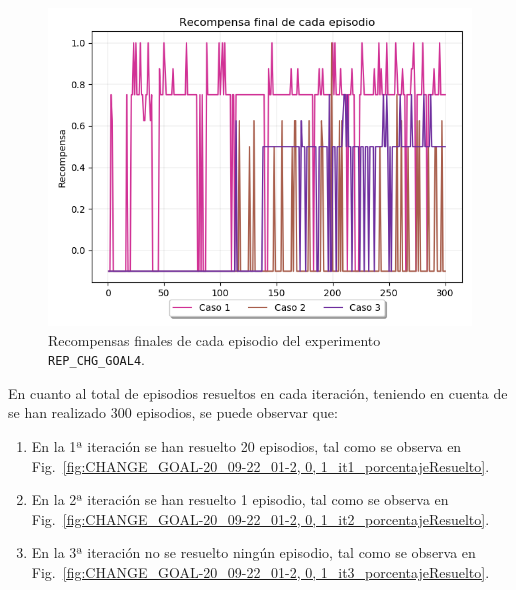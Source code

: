 \begin{figure}
    \centering
    \includegraphics[scale=0.4]{cap5_experimentacion/images/CHANGE_GOAL-20_09-22_01-2, 0, 1_recompensa.png}
    \caption{Recompensas finales de cada episodio del experimento \texttt{REP\_CHG\_GOAL4}.}
    \label{fig:CHANGE_GOAL-20_09-22_01-2, 0, 1_recompensa}
\end{figure}

En cuanto al total de episodios resueltos en cada iteración, teniendo en cuenta de se han realizado 300 episodios, se puede observar que: 
\begin{enumerate}
    \item En la 1ª iteración se han resuelto 20 episodios, tal como se observa en Fig.~\ref{fig:CHANGE_GOAL-20_09-22_01-2, 0, 1_it1_porcentajeResuelto}.
    \item En la 2ª iteración se han resuelto 1 episodio, tal como se observa en Fig.~\ref{fig:CHANGE_GOAL-20_09-22_01-2, 0, 1_it2_porcentajeResuelto}.
    \item En la 3ª iteración no se resuelto ningún episodio, tal como se observa en Fig.~\ref{fig:CHANGE_GOAL-20_09-22_01-2, 0, 1_it3_porcentajeResuelto}.
\end{enumerate}

